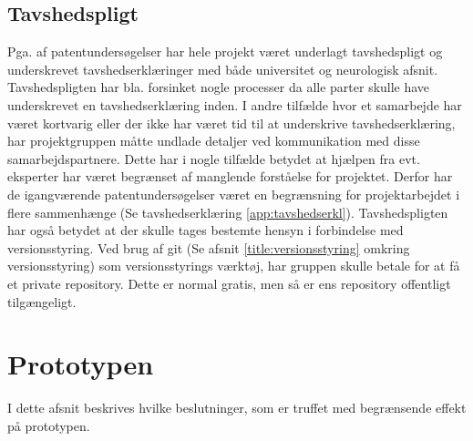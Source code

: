 \subsection{Tavshedspligt} \label{title:tavshedspligt}
Pga. af patentundersøgelser har hele projekt været underlagt tavshedspligt og underskrevet tavshedserklæringer med både universitet og neurologisk afsnit. Tavshedspligten har bla. forsinket nogle processer da alle parter skulle have underskrevet en tavshedserklæring inden. I andre tilfælde hvor et samarbejde har været kortvarig eller der ikke har været tid til at underskrive tavshedserklæring, har projektgruppen måtte undlade detaljer ved kommunikation med disse samarbejdspartnere. Dette har i nogle tilfælde betydet at hjælpen fra evt. eksperter har været begrænset af manglende forståelse for projektet.  Derfor har de igangværende patentundersøgelser været en begrænsning for projektarbejdet i flere sammenhænge (Se tavshedserklæring \ref{app:tavshedserkl}).
Tavshedspligten har også betydet at der skulle tages bestemte hensyn i forbindelse med versionsstyring. Ved brug af git (Se afsnit \ref{title:versionsstyring} omkring versionsstyring) som versionsstyrings værktøj, har gruppen skulle betale for at få et private repository. Dette er normal gratis, men så er ens repository offentligt tilgængeligt.

\newpage
\section{Prototypen}
I dette afsnit beskrives hvilke beslutninger, som er truffet med begrænsende effekt på prototypen.

